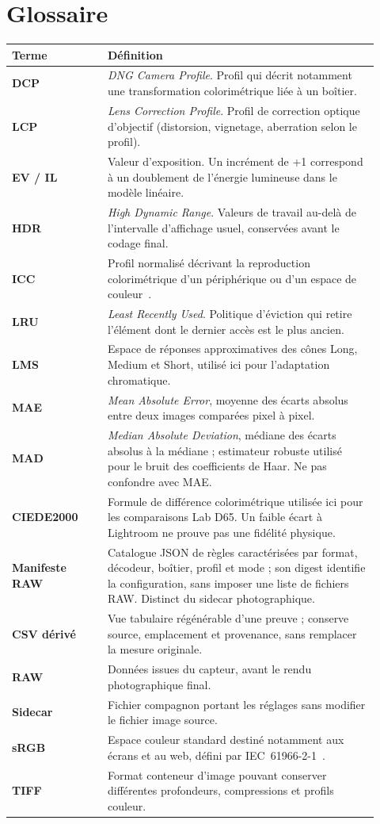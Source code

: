 \chapter{Glossaire}
\label{chap:glossaire}

\begin{longtable}{p{0.24\linewidth}p{0.68\linewidth}}
\toprule
Terme & Définition \\
\midrule
\endhead
\textbf{DCP} & \emph{DNG Camera Profile}. Profil qui décrit notamment une transformation colorimétrique liée à un boîtier. \\
\textbf{LCP} & \emph{Lens Correction Profile}. Profil de correction optique d'objectif (distorsion, vignetage, aberration selon le profil). \\
\textbf{EV / IL} & Valeur d'exposition. Un incrément de +1 correspond à un doublement de l'énergie lumineuse dans le modèle linéaire. \\
\textbf{HDR} & \emph{High Dynamic Range}. Valeurs de travail au-delà de l'intervalle d'affichage usuel, conservées avant le codage final. \\
\textbf{ICC} & Profil normalisé décrivant la reproduction colorimétrique d'un périphérique ou d'un espace de couleur~\cite{icc2022}. \\
\textbf{LRU} & \emph{Least Recently Used}. Politique d'éviction qui retire l'élément dont le dernier accès est le plus ancien. \\
\textbf{LMS} & Espace de réponses approximatives des cônes Long, Medium et Short, utilisé ici pour l'adaptation chromatique. \\
\textbf{MAE} & \emph{Mean Absolute Error}, moyenne des écarts absolus entre deux images comparées pixel à pixel. \\
\textbf{MAD} & \emph{Median Absolute Deviation}, médiane des écarts absolus à la médiane ; estimateur robuste utilisé pour le bruit des coefficients de Haar. Ne pas confondre avec MAE. \\
\textbf{CIEDE2000} & Formule de différence colorimétrique utilisée ici pour les comparaisons Lab D65. Un faible écart à Lightroom ne prouve pas une fidélité physique. \\
\textbf{Manifeste RAW} & Catalogue JSON de règles caractérisées par format, décodeur, boîtier, profil et mode ; son digest identifie la configuration, sans imposer une liste de fichiers RAW. Distinct du sidecar photographique. \\
\textbf{CSV dérivé} & Vue tabulaire régénérable d'une preuve ; conserve source, emplacement et provenance, sans remplacer la mesure originale. \\
\textbf{RAW} & Données issues du capteur, avant le rendu photographique final. \\
\textbf{Sidecar} & Fichier compagnon portant les réglages sans modifier le fichier image source. \\
\textbf{sRGB} & Espace couleur standard destiné notamment aux écrans et au web, défini par IEC~61966-2-1~\cite{srgb}. \\
\textbf{TIFF} & Format conteneur d'image pouvant conserver différentes profondeurs, compressions et profils couleur. \\
\bottomrule
\end{longtable}
